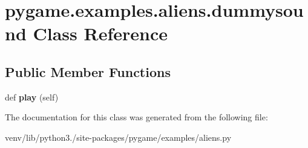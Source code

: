 \hypertarget{classpygame_1_1examples_1_1aliens_1_1dummysound}{}\section{pygame.\+examples.\+aliens.\+dummysound Class Reference}
\label{classpygame_1_1examples_1_1aliens_1_1dummysound}
\subsection*{Public Member Functions}
\begin{DoxyCompactItemize}
\item 
\mbox{\label{classpygame_1_1examples_1_1aliens_1_1dummysound_ae297b92ea4a8bf578e54b0a79e413b14}} 
def {\bfseries play} (self)
\end{DoxyCompactItemize}


The documentation for this class was generated from the following file\+:\begin{DoxyCompactItemize}
\item 
venv/lib/python3./site-\/packages/pygame/examples/aliens.\+py\end{DoxyCompactItemize}
